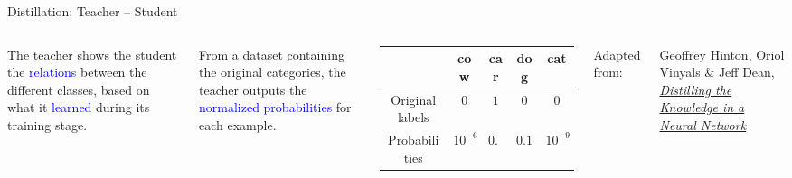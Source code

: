 \begin{frame}{Distillation: Teacher -- Student}
  \begin{columns}[T,onlytextwidth]
      The teacher shows the student the \textcolor{blue}{relations} between the different classes, based on what it \textcolor{blue}{learned} during its training stage.

      \vspace{0.6em}
      From a dataset containing the original categories, the teacher outputs the \textcolor{blue}{normalized probabilities} for each example.

      \centering
      \setlength{\tabcolsep}{0.45em}
      \renewcommand{\arraystretch}{1.22}
      \begin{tabular}{c|cccc}
        & \footnotesize cow & \footnotesize car & \footnotesize dog & \footnotesize cat \\
        \hline
        \footnotesize Original labels & $0$ & $1$ & $0$ & $0$ \\
        \footnotesize Probabilities & $10^{-6}$ & $0.9$ & $0.1$ & $10^{-9}$ \\
      \end{tabular}
 
      \vspace{0.6em}

      {\scriptsize
        Adapted from:\par
        Geoffrey Hinton, Oriol Vinyals \& Jeff Dean, \href{https://arxiv.org/abs/1503.02531}{\textit{Distilling the Knowledge in a Neural Network}}
      }
  \end{columns}
\end{frame}


